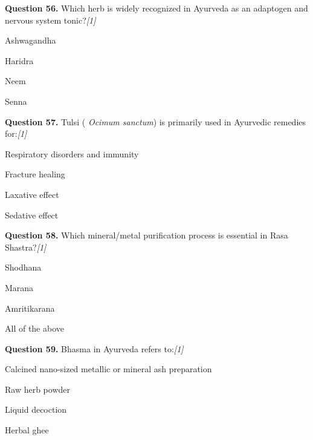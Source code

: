 \documentclass[11pt,a4paper]{article}
\newcommand{\pts}[1]{\hfill   \textit{[#1]}}
\begin{document}
\medskip




\noindent   \textbf{Question 56.} Which herb is widely recognized in Ayurveda as an adaptogen and nervous system tonic?\pts{1}

\begin{parts}
  \item Ashwagandha
  \item Haridra
  \item Neem
  \item Senna
\end{parts}

\medskip




\noindent   \textbf{Question 57.} Tulsi (   \textit{Ocimum sanctum}) is primarily used in Ayurvedic remedies for:\pts{1}

\begin{parts}
  \item Respiratory disorders and immunity
  \item Fracture healing
  \item Laxative effect
  \item Sedative effect
\end{parts}

\medskip




\noindent   \textbf{Question 58.} Which mineral/metal purification process is essential in Rasa Shastra?\pts{1}

\begin{parts}
  \item Shodhana
  \item Marana
  \item Amritikarana
  \item All of the above
\end{parts}

\medskip




\noindent   \textbf{Question 59.} Bhasma in Ayurveda refers to:\pts{1}

\begin{parts}
  \item Calcined nano-sized metallic or mineral ash preparation
  \item Raw herb powder
  \item Liquid decoction
  \item Herbal ghee
\end{parts}

\medskip
\end{document}
